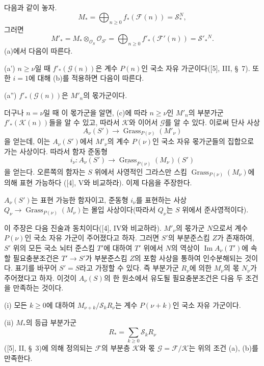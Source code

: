 다음과 같이 놓자.
\[
M_* =\bigoplus_{n\geq0}f_*(\mathcal F(n))=\mathcal S_*^{N},
\]
그러면
\[
M'_* =M_*\otimes_{\mathcal O_S}\mathcal O_{S'}
=\bigoplus_{n\geq0}f'_*(\mathcal F'(n))=\mathcal S'_*{}^{N}.
\]
(a)에서 다음이 따른다.

\noindent (a') $n\geq\nu$일 때 $f'_*(\mathcal G(n))$은 계수 $P(n)$인
국소 자유 가군이다([5], III, \S~7). 또한 $i=1$에 대해 (b)를 적용하면
다음이 따른다.

\noindent (a'') $f'_*(\mathcal G(n))$은 $M'_n$의 몫가군이다.

더구나 $n=\nu$일 때 이 몫가군을 알면, (c)에 따라 $n\geq\nu$인
$M'_n$의 부분가군 $f'_*(\mathcal K(n))$들을 알 수 있고, 따라서
$\mathcal K$와 이어서 $\mathcal G$를 알 수 있다. 이로써 단사 사상
\[
A_\nu(S')\longrightarrow\operatorname{Grass}_{P(\nu)}(M'_\nu)
\]
을 얻는데, 이는 $A_\nu(S')$에서 $M'_\nu$의 계수 $P(\nu)$인 국소 자유
몫가군들의 집합으로 가는 사상이다. 따라서 함자 준동형
\[
i_\nu:A_\nu(S')\longrightarrow
\underline{\operatorname{Grass}}_{P(\nu)}(M_\nu)(S')
\]
을 얻는다. 오른쪽의 함자는 $S$ 위에서 사영적인 그라스만 스킴
$\operatorname{Grass}_{P(\nu)}(M_\nu)$에 의해 표현 가능하다
([4], V와 비교하라). 이제 다음을 주장한다.

 $A_\nu(S')$는 표현 가능한 함자이고, 준동형
$i_\nu$를 표현하는 사상
$Q_\nu\longrightarrow\operatorname{Grass}_{P(\nu)}(M_\nu)$는
몰입 사상이다(따라서 $Q_\nu$는 $S$ 위에서 준사영적이다).

이 주장은 다음 진술과 동치이다([4], IV와 비교하라). $M'_\nu$의
몫가군 $N$으로서 계수 $P(\nu)$인 국소 자유 가군이 주어졌다고 하자.
그러면 $S'$의 부분준스킴 $Z$가 존재하여, $S'$ 위의 모든 국소 뇌터
준스킴 $T'$에 대하여
$T'$ 위에서 $N$의 역상이 $\operatorname{Im}A_\nu(T')$에 속할
필요충분조건은 $T'\longrightarrow S'$가 부분준스킴 $Z$의 포함 사상을
통하여 인수분해되는 것이다. 표기를 바꾸어 $S'=S$라고 가정할 수 있다.
즉 부분가군 $R_\nu$에 의한 $M_\nu$의 몫 $N_\nu$가 주어졌다고 하자.
이것이 $A_\nu(S)$의 한 원소에서 유도될 필요충분조건은 다음 두 조건을
만족하는 것이다.

\medskip
\noindent (i) 모든 $k\geq0$에 대하여
$M_{\nu+k}/\mathcal S_kR_\nu$는 계수 $P(\nu+k)$인 국소 자유 가군이다.

\smallskip
\noindent (ii) $M_*$의 등급 부분가군
\[
R_* =\sum_{k\geq0}\mathcal S_kR_\nu
\]
([5], II, \S~3)에 의해 정의되는 $\mathcal F$의 부분층 $\mathcal K$와
몫 $\mathcal G=\mathcal F/\mathcal K$는 위의 조건 (a), (b)를 만족한다.


